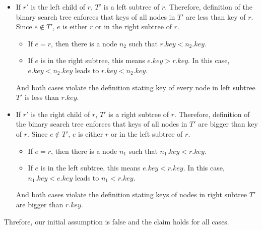 \begin{itemize}[itemsep=1mm] \parskip=0pt \parsep=0pt
\item If $r'$ is the left child of $r$, $T'$ is a left subtree of $r$.
Therefore, definition of the binary search tree enforces that keys of all nodes in $T'$ are less than key of $r$.
Since $e \notin T'$, $e$ is either $r$ or in the right subtree of $r$.
\begin{itemize}[itemsep=1mm] \parskip=0pt \parsep=0pt
  \item[] If $e = r$, then there is a node $n_2$ such that $r.key < n_2.key$.
  \item[] If $e$ is in the right subtree, this means $e.key > r.key$.
In this case, $e.key < n_2.key$ leads to $r.key < n_2.key$.
\end{itemize}
And both cases violate the definition stating key of every node in left subtree $T'$ is less than $r.key$.
\item If $r'$ is the right child of $r$, $T'$ is a right subtree of $r$.
Therefore, definition of the binary search tree enforces that keys of all nodes in $T'$ are bigger than key of $r$.
Since $e \notin T'$, $e$ is either $r$ or in the left subtree of $r$.
\begin{itemize}[itemsep=1mm] \parskip=0pt \parsep=0pt
  \item[] If $e = r$, then there is a node $n_1$ such that $n_1.key < r.key$.
  \item[] If $e$ is in the left subtree, this means $e.key < r.key$.
In this case, $n_1.key < e.key$ leads to $n_1 < r.key$.
\end{itemize}
And both cases violate the definition stating keys of nodes in right subtree $T'$ are bigger than $r.key$.
\end{itemize}
Threfore, our initial assumption is false and the claim holds for all cases.
